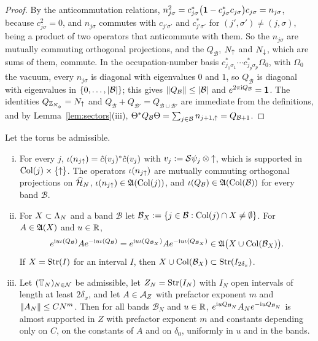 \begin{proof}
By the anticommutation relations, $n_{j\sigma}^2=c^*_{j\sigma}\bigl(\mathbf{1}-c^*_{j\sigma}c_{j\sigma}\bigr)c_{j\sigma}=n_{j\sigma}$,
because $c_{j\sigma}^2=0$, and $n_{j\sigma}$ commutes with $c_{j'\sigma'}$ and $c^*_{j'\sigma'}$ for
$(j',\sigma')\ne(j,\sigma)$, being a product of two operators that anticommute with them. So the $n_{j\sigma}$ are
mutually commuting orthogonal projections, and the $Q_{\mathcal B}$, $N_{\uparrow}$ and $N_{\downarrow}$, which are sums of them,
commute. In the occupation-number basis $c^*_{j_1\sigma_1}\cdots c^*_{j_p\sigma_p}\Omega_0$, with $\Omega_0$ the vacuum, every
$n_{j\sigma}$ is diagonal with eigenvalues $0$ and $1$, so $Q_{\mathcal B}$ is diagonal with eigenvalues in
$\{0,\dots,\lvert\mathcal B\rvert\}$; this gives $\lVert Q_{\mathcal B}\rVert\le\lvert\mathcal B\rvert$ and $e^{2\pi\mathrm{i} Q_{\mathcal B}}=\mathbf{1}$. The
identities $Q_{\mathbb{Z}_{N_{\phi}}}=N_{\uparrow}$ and $Q_{\mathcal B}+Q_{\mathcal B'}=Q_{\mathcal B\cup\mathcal B'}$ are immediate from the
definitions, and by Lemma~\ref{lem:sectors}(iii), $\Theta^*Q_{\mathcal B}\Theta=\sum_{j\in\mathcal B}n_{j+1,{\uparrow}}=Q_{\mathcal B+1}$.
\end{proof}

\begin{lemma}\label{lem:bandcharges}
Let the torus be admissible.
\begin{enumerate}[(i)]
\item For every $j$, $\iota(n_{j{\uparrow}})=\hat{c}(v_j)^*\hat{c}(v_j)$ with $v_j:=\mathcal{S}\psi_j\otimes{\uparrow}$, which is supported in
$\mathrm{Col}(j)\times\{{\uparrow}\}$. The operators $\iota(n_{j{\uparrow}})$ are mutually commuting orthogonal projections on $\widehat{\mathcal{H}}_N$,
$\iota(n_{j{\uparrow}})\in\mathfrak{A}(\mathrm{Col}(j))$, and $\iota(Q_{\mathcal B})\in\mathfrak{A}(\mathrm{Col}(\mathcal B))$ for every band $\mathcal B$.
\item For $X\subset\Lambda_N$ and a band $\mathcal B$ let $\mathcal B_X:=\{j\in\mathcal B:\mathrm{Col}(j)\cap X\ne\emptyset\}$. For
$A\in\mathfrak{A}(X)$ and $u\in\mathbb{R}$,
\[
e^{\mathrm{i} u\iota(Q_{\mathcal B})}Ae^{-\mathrm{i} u\iota(Q_{\mathcal B})}=e^{\mathrm{i} u\iota(Q_{\mathcal B_X})}Ae^{-\mathrm{i} u\iota(Q_{\mathcal B_X})}
\in\mathfrak{A}\bigl(X\cup\mathrm{Col}(\mathcal B_X)\bigr).
\]
If $X=\mathrm{Str}(I)$ for an interval $I$, then $X\cup\mathrm{Col}(\mathcal B_X)\subset\mathrm{Str}(I_{2\delta_x})$.
\item Let $(\mathbb{T}_N)_{N\in\mathcal N}$ be admissible, let $Z_N=\mathrm{Str}(I_N)$ with $I_N$ open intervals of length at least
$2\delta_x$, and let $A\in\mathcal{A}_Z$ with prefactor exponent $m$ and $\lVert A_N\rVert\le CN^m$. Then for all bands
$\mathcal B_N$ and $u\in\mathbb{R}$, $e^{\mathrm{i} uQ_{\mathcal B_N}}A_Ne^{-\mathrm{i} uQ_{\mathcal B_N}}$ is almost supported in $Z$ with
prefactor exponent $m$ and constants depending only on $C$, on the constants of $A$ and on $\delta_0$,
uniformly in $u$ and in the bands.
\end{enumerate}
\end{lemma}

